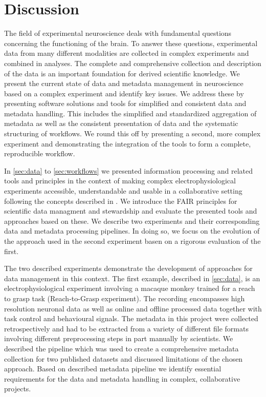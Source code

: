 \clearpage
\chapter{Discussion}
\label{sec:discussion}


The field of experimental neuroscience deals with fundamental questions concerning the functioning of the brain. To answer these questions, experimental data from many different modalities are collected in complex experiments and combined in analyses. The complete and comprehensive collection and description of the data is an important foundation for derived scientific knowledge. We present the current state of data and metadata management in neuroscience based on a complex experiment and identify key issues. We address these by presenting software solutions and tools for simplified and consistent data and metadata handling. This includes the simplified and standardized aggregation of metadata as well as the consistent presentation of data and the systematic structuring of workflows. We round this off by presenting a second, more complex experiment and demonstrating the integration of the tools to form a complete, reproducible workflow.

In \cref{sec:data} to \cref{sec:workflows} we presented information processing and related tools and principles in the context of making complex electrophysiological experiments accessible, understandable and usable in a collaborative setting following the concepts described in \citet{Zehl_2016, Zehl_2018}. We introduce the FAIR principles for scientific data managment and stewardship and evaluate the presented tools and approaches based on these. We describe two experiments and their corresponding data and metadata processing pipelines. In doing so, we focus on the evolution of the approach used in the second experiment basen on a rigorous evaluation of the first.

The two described experiments demonstrate the development of approaches for data management in this context. The first example, described in \cref{sec:data}, is an electrophysiological experiment involving a macaque monkey trained for a reach to grasp task (Reach-to-Grasp experiment). The recording encompasses high resolution neuronal data as well as online and offline processed data together with task control and behavioural signals. The metadata in this project were collected retrospectively and had to be extracted from a variety of different file formats involving different preprocessing steps in part manually by scientists. We described the pipeline which was used to create a comprehensive metadata collection for two published datasets and discussed limitations of the chosen approach. Based on described metadata pipeline we identify essential requirements for the data and metadata handling in complex, collaborative projects.

